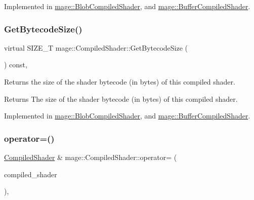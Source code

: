 Implemented in \hyperlink{classmage_1_1_blob_compiled_shader_a44cc21b9ab038c57155e64e8ced4d504}{mage\+::\+Blob\+Compiled\+Shader}, and \hyperlink{classmage_1_1_buffer_compiled_shader_ae6b2b4b5c9b96d7ca680724ccf0affb3}{mage\+::\+Buffer\+Compiled\+Shader}.

\hypertarget{classmage_1_1_compiled_shader_ae9dbc3c205d54cc89b9b0746b76b157b}{}\label{classmage_1_1_compiled_shader_ae9dbc3c205d54cc89b9b0746b76b157b} 
\subsubsection{\texorpdfstring{Get\+Bytecode\+Size()}{GetBytecodeSize()}}
{\footnotesize\ttfamily virtual S\+I\+Z\+E\+\_\+T mage\+::\+Compiled\+Shader\+::\+Get\+Bytecode\+Size (\begin{DoxyParamCaption}{ }\end{DoxyParamCaption}) const\hspace{0.3cm}{\ttfamily [pure virtual]}, {\ttfamily [noexcept]}}

Returns the size of the shader bytecode (in bytes) of this compiled shader.

\begin{DoxyReturn}{Returns}
The size of the shader bytecode (in bytes) of this compiled shader. 
\end{DoxyReturn}


Implemented in \hyperlink{classmage_1_1_blob_compiled_shader_a685f2a4aac87aa785c22940075eb23ec}{mage\+::\+Blob\+Compiled\+Shader}, and \hyperlink{classmage_1_1_buffer_compiled_shader_aa9ab3a1df896367280c259734ff29bc0}{mage\+::\+Buffer\+Compiled\+Shader}.

\hypertarget{classmage_1_1_compiled_shader_aeb91e4d48420341f83646a6203fe138d}{}\label{classmage_1_1_compiled_shader_aeb91e4d48420341f83646a6203fe138d} 
\subsubsection{\texorpdfstring{operator=()}{operator=()}\hspace{0.1cm}{\footnotesize\ttfamily [1/2]}}
{\footnotesize\ttfamily \hyperlink{classmage_1_1_compiled_shader}{Compiled\+Shader} \& mage\+::\+Compiled\+Shader\+::operator= (\begin{DoxyParamCaption}\item[{const \hyperlink{classmage_1_1_compiled_shader}{Compiled\+Shader} \&}]{compiled\+\_\+shader }\end{DoxyParamCaption})\hspace{0.3cm}{\ttfamily [default]}, {\ttfamily [noexcept]}}

